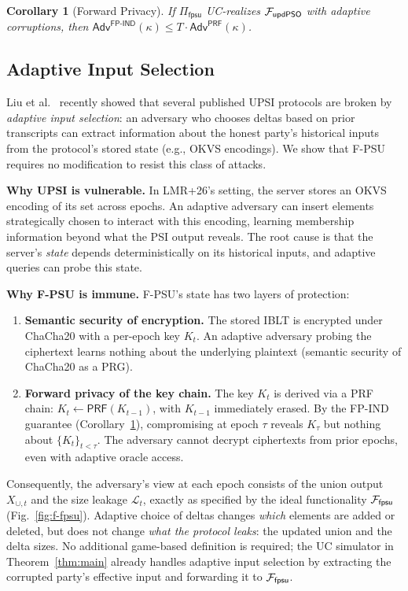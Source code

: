 \documentclass[letterpaper,twocolumn,10pt]{article}
\newtheorem{corollary}[theorem]{Corollary}
\theoremstyle{definition}
\newcommand{\cL}{\mathcal{L}}\newcommand{\cS}{\mathcal{S}}
\newcommand{\PRF}{\mathsf{PRF}}\newcommand{\ChaCha}{\mathsf{ChaCha20}}
\begin{document}
\begin{corollary}[Forward Privacy]\label{cor:fp}
If $\Pi_{\mathsf{fpsu}}$ UC-realizes $\mathcal{F}_{\mathsf{updPSO}}$ with adaptive
corruptions, then $\mathsf{Adv}^{\mathsf{FP\text{-}IND}}(\kappa) \leq T \cdot
\mathsf{Adv}^{\mathsf{PRF}}(\kappa)$.
\end{corollary}

\subsection{Adaptive Input Selection}

Liu et al.~\cite{LMR+26} recently showed that several published UPSI protocols
are broken by \emph{adaptive input selection}: an adversary who chooses deltas
based on prior transcripts can extract information about the honest party's
historical inputs from the protocol's stored state (e.g., OKVS encodings). We
show that F-PSU requires no modification to resist this class of attacks.

\smallskip\noindent\textbf{Why UPSI is vulnerable.}
In LMR+26's setting, the server stores an OKVS encoding of its set across
epochs. An adaptive adversary can insert elements strategically chosen to
interact with this encoding, learning membership information beyond what the
PSI output reveals. The root cause is that the server's \emph{state} depends
deterministically on its historical inputs, and adaptive queries can probe
this state.

\smallskip\noindent\textbf{Why F-PSU is immune.}
F-PSU's state has two layers of protection:
\begin{enumerate}
\item \textbf{Semantic security of encryption.} The stored IBLT is encrypted
under ChaCha20 with a per-epoch key $K_t$. An adaptive adversary probing the
ciphertext learns nothing about the underlying plaintext (semantic security of
ChaCha20 as a PRG).
\item \textbf{Forward privacy of the key chain.} The key $K_t$ is derived via a
PRF chain: $K_t \leftarrow \PRF(K_{t-1})$, with $K_{t-1}$ immediately erased.
By the FP-IND guarantee (Corollary~\ref{cor:fp}), compromising at epoch $\tau$
reveals $K_\tau$ but nothing about $\{K_t\}_{t < \tau}$. The adversary cannot
decrypt ciphertexts from prior epochs, even with adaptive oracle access.
\end{enumerate}

Consequently, the adversary's view at each epoch consists of the union output
$X_{\cup,t}$ and the size leakage $\cL_t$, exactly as specified by the ideal
functionality $\mathcal{F}_{\mathsf{fpsu}}$ (Fig.~\ref{fig:f-fpsu}). Adaptive choice
of deltas changes \emph{which} elements are added or deleted, but does not
change \emph{what the protocol leaks}: the updated union and the delta sizes.
No additional game-based definition is required; the UC simulator in
Theorem~\ref{thm:main} already handles adaptive input selection by extracting
the corrupted party's effective input and forwarding it to $\mathcal{F}_{\mathsf{fpsu}}$.
\end{document}
